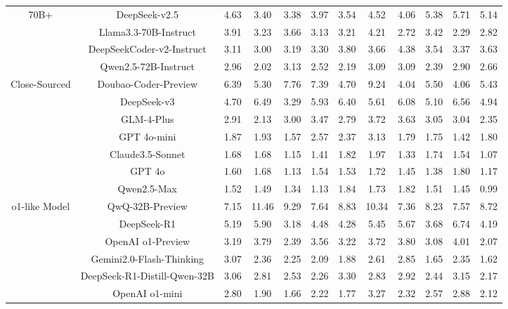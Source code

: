 \documentclass[11pt, a4paper, logo, copyright, nonumbering, amsart]{map}
\begin{document}
\begin{CJK*}{UTF8}{gbsn}
\begin{table*}[h!]
\begin{adjustbox}{width=\textwidth}
\begin{tabular}{c|c|cccccccccc}
    \midrule
    \multirow{4}{*}{70B+} 
    & DeepSeek-v2.5 & 4.63 & 3.40 & 3.38 & 3.97 & 3.54 & 4.52 & 4.06 & 5.38 & 5.71 & 5.14 \\
    & Llama3.3-70B-Instruct & 3.91 & 3.23 & 3.66 & 3.13 & 3.21 & 4.21 & 2.72 & 3.42 & 2.29 & 2.82 \\
    & DeepSeekCoder-v2-Instruct & 3.11 & 3.00 & 3.19 & 3.30 & 3.80 & 3.66 & 4.38 & 3.54 & 3.37 & 3.63 \\
    & Qwen2.5-72B-Instruct & 2.96 & 2.02 & 3.13 & 2.52 & 2.19 & 3.09 & 3.09 & 2.39 & 2.90 & 2.66 \\
    
    \midrule
    \multirow{7}{*}{Close-Sourced}
    & Doubao-Coder-Preview & 6.39 & 5.30 & 7.76 & 7.39 & 4.70 & 9.24 & 4.04 & 5.50 & 4.06 & 5.43 \\
    & DeepSeek-v3 & 4.70 & 6.49 & 3.29 & 5.93 & 6.40 & 5.61 & 6.08 & 5.10 & 6.56 & 4.94 \\
    & GLM-4-Plus & 2.91 & 2.13 & 3.00 & 3.47 & 2.79 & 3.72 & 3.63 & 3.05 & 3.04 & 2.35 \\
    & GPT 4o-mini & 1.87 & 1.93 & 1.57 & 2.57 & 2.37 & 3.13 & 1.79 & 1.75 & 1.42 & 1.80 \\
    & Claude3.5-Sonnet & 1.68 & 1.68 & 1.15 & 1.41 & 1.82 & 1.97 & 1.33 & 1.74 & 1.54 & 1.07 \\
    & GPT 4o & 1.60 & 1.68 & 1.13 & 1.54 & 1.53 & 1.72 & 1.45 & 1.38 & 1.80 & 1.17 \\
    & Qwen2.5-Max & 1.52 & 1.49 & 1.34 & 1.13 & 1.84 & 1.73 & 1.82 & 1.51 & 1.45 & 0.99 \\
    
    \midrule
    \multirow{6}{*}{o1-like Model}
    & QwQ-32B-Preview & 7.15 & 11.46 & 9.29 & 7.64 & 8.83 & 10.34 & 7.36 & 8.23 & 7.57 & 8.72 \\
    & DeepSeek-R1 & 5.19 & 5.90 & 3.18 & 4.48 & 4.28 & 5.45 & 5.67 & 3.68 & 6.74 & 4.19 \\
    & OpenAI o1-Preview & 3.19 & 3.79 & 2.39 & 3.56 & 3.22 & 3.72 & 3.80 & 3.08 & 4.01 & 2.07 \\
    & Gemini2.0-Flash-Thinking & 3.07 & 2.36 & 2.25 & 2.09 & 1.88 & 2.61 & 2.85 & 1.65 & 2.35 & 1.62 \\
    & DeepSeek-R1-Distill-Qwen-32B & 3.06 & 2.81 & 2.53 & 2.26 & 3.30 & 2.83 & 2.92 & 2.44 & 3.15 & 2.17 \\
    & OpenAI o1-mini & 2.80 & 1.90 & 1.66 & 2.22 & 1.77 & 3.27 & 2.32 & 2.57 & 2.88 & 2.12 \\
    \bottomrule
    \end{tabular}
    \end{adjustbox}
\end{table*}


\end{CJK*}
\end{document}
